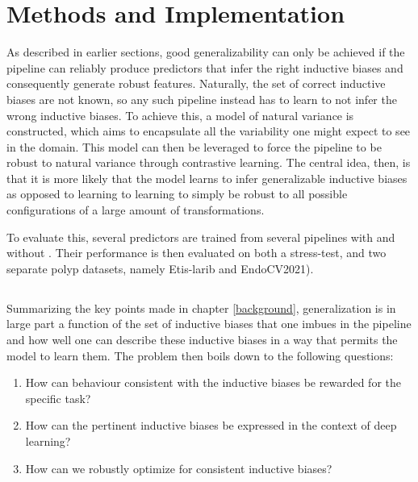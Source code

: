 \chapter{Methods and Implementation}
\setcounter{chapter}{3}
    As described in earlier sections, good generalizability can only be achieved if the pipeline can reliably produce predictors that infer the right inductive biases and consequently generate robust features. Naturally, the set of correct inductive biases are not known, so any such pipeline instead has to learn to not infer the wrong inductive biases. To achieve this, a model of natural variance is constructed, which aims to encapsulate all the variability one might expect to see in the domain. This model can then be leveraged to force the pipeline to be robust to natural variance through contrastive learning.  The central idea, then, is that it is more likely that the model learns to infer generalizable inductive biases as opposed to learning to learning to simply be robust to all possible configurations of a large amount of transformations. 
	
	To evaluate this, several predictors are trained from several pipelines with and without \alg. Their performance is then evaluated on both a stress-test, and two separate polyp datasets, namely Etis-larib and EndoCV2021). 
\section{\alg}
	Summarizing the key points made in chapter \ref{background}, generalization is in large part a function of the set of inductive biases that one imbues in the pipeline and how well one can describe these inductive biases in a way that permits the model to learn them. The problem then boils down to the following questions:
	\begin{enumerate}
		\item How can behaviour consistent with the inductive biases be rewarded for the specific task? \label{loss}
		\item How can the pertinent inductive biases be expressed in the context of deep learning? \label{mnv}
		\item How can we robustly optimize for consistent inductive biases? \label{training}
	\end{enumerate}
	

